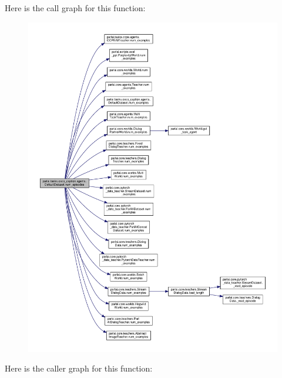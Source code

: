 Here is the call graph for this function\+:
\nopagebreak
\begin{figure}[H]
\begin{center}
\leavevmode
\includegraphics[width=350pt]{classparlai_1_1tasks_1_1coco__caption_1_1agents_1_1DefaultDataset_a436d5bfe6f79ae3d94f1935e56bf4f84_cgraph}
\end{center}
\end{figure}
Here is the caller graph for this function\+:
\nopagebreak
